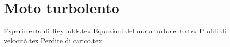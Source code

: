 %
\chapter{Moto turbolento}
%
{Esperimento di Reynolds.tex}
{Equazioni del moto turbolento.tex}
{Profili di velocità.tex}
{Perdite di carico.tex} 
